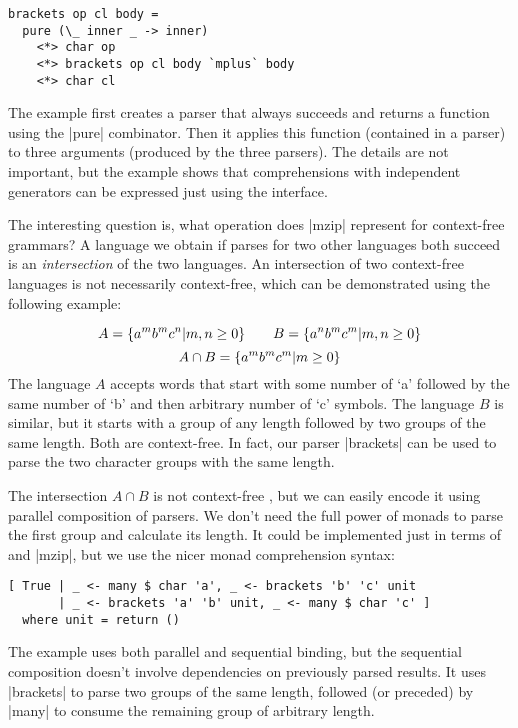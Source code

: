 \documentclass{tmr}
\newcommand{\authornote}[3]{}
\newcommand\bay[1]{\authornote{brent}{blue}{#1}}
\newcommand\tp[1]{\authornote{tomas}{red}{#1}}
\begin{document}
\begin{verbatim}
brackets op cl body = 
  pure (\_ inner _ -> inner)
    <*> char op
    <*> brackets op cl body `mplus` body
    <*> char cl
\end{verbatim}
The example first creates a parser that always succeeds and returns a function using the |pure| 
combinator. Then it applies this function (contained in a parser) to three arguments (produced
by the three parsers). The details are not important, but the example shows that comprehensions
with independent generators can be expressed just using the  interface.

\bay{These last two sentences are just
  repeating what was already said in the previous paragraph; they
  should probably be cut down significantly.}
\tp{Simplified first and deleted the second.}

The interesting question is, what operation does |mzip|
represent for context-free grammars? A language we obtain if parses for two other languages both 
succeed is an \textit{intersection} of the two languages. An intersection of two context-free 
languages is not necessarily context-free, which can be demonstrated using the following example:

\[ 
A = \{ a^m b^m c^n \arrowvert m, n \geq 0 \} 
\qquad
B = \{ a^n b^m c^m \arrowvert m, n \geq 0 \} 
\]
\[ 
A \cap B = \{ a^m b^m c^m \arrowvert m \geq 0 \}
\]
The language $A$ accepts words that start with some number of `a' followed by the same
number of `b' and then arbitrary number of `c' symbols. The language $B$ is similar, but it
starts with a group of any length followed by two groups of the same length. Both are context-free. In fact, our parser |brackets| can be used to parse the two 
character groups with the same length.

The intersection $A \cap B$ is not context-free \cite{cflintersect}, but we can easily
encode it using parallel composition of parsers. We don't need the full power of monads
to parse the first group and calculate its length. It could be implemented just in terms of
 and |mzip|, but we use the nicer monad comprehension syntax:

\begin{verbatim}
[ True | _ <- many $ char 'a', _ <- brackets 'b' 'c' unit
       | _ <- brackets 'a' 'b' unit, _ <- many $ char 'c' ]
  where unit = return ()
\end{verbatim}
The example uses both parallel and sequential binding, but the sequential composition doesn't
involve dependencies on previously parsed results. It uses |brackets| to parse two groups of the
same length, followed (or preceded) by |many| to consume the remaining group of arbitrary length.
\end{document}
